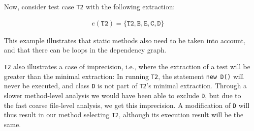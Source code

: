 {Now, consider test case \texttt{T2} with the following extraction:

\begin{eqnarray}
e(\texttt{T2}) = \{\texttt{T2}, \texttt{B}, \texttt{E}, \texttt{C}, \texttt{D}\} \nonumber
\end{eqnarray}

This example illustrates that static methods also need to be taken into account, and that there can be loops in the dependency graph.

\texttt{T2} also illustrates a case of imprecision, i.e., where the extraction of a test will be greater than the minimal extraction: In running \texttt{T2}, the statement \texttt{new D()} will never be executed, and class \texttt{D} is not part of \texttt{T2}'s minimal extraction. Through a slower method-level analysis we would have been able to exclude \texttt{D}, but due to the fast coarse file-level analysis, we get this imprecision. A modification of \texttt{D} will thus result in our method selecting \texttt{T2}, although its execution result will be the same.


\begin{figure}
  \centering
\begin{adjustbox}{max width=\linewidth}
\end{adjustbox}
\end{figure}}
